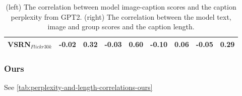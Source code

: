 \begin{table}[ht]
\begin{adjustbox}{max width=\textwidth}
\begin{tabular}{l|rr|rrrrrr}
 VSRN$_{Flickr30k}$           & -0.02          & 0.32          & -0.03          & 0.60          & -0.10          & 0.06          & -0.05          & 0.29          \\
\bottomrule
\end{tabular}
\end{adjustbox}
\caption{(left) The correlation between model image-caption scores and the caption perplexity from GPT2. (right) The correlation between the model text, image and group scores and the caption length.}
\label{tab:perplexity-and-length-correlations-baseline}
\end{table}

\subsubsection{Ours}

See \cref{tab:perplexity-and-length-correlations-ours}

